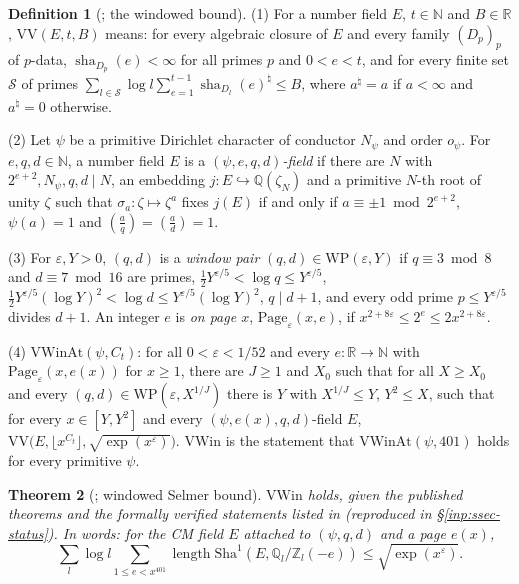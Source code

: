 \documentclass[10pt]{amsart}
\newtheorem{theorem}{Theorem}[section]
\theoremstyle{definition}
\newtheorem{definition}[theorem]{Definition}
\theoremstyle{remark}
\newcommand{\R}{\mathbb R}
\newcommand{\N}{\mathbb N}
\newcommand{\Z}{\mathbb Z}
\newcommand{\Q}{\mathbb Q}
\begin{document}
\begin{definition}[{\cite[Definition~\ref{A-i5:def-vwin}]{Annex}}; the windowed bound]\label{inp:def-vwin}
(1) For a number field $E$, $t\in\N$ and $B\in\R$, $\mathrm{VV}(E,t,B)$ means:
for every algebraic closure of $E$ and every family $(D_p)_p$ of $p$-data,
$\operatorname{sha}_{D_p}(e)<\infty$ for all primes $p$ and $0<e<t$, and for
every finite set $\mathcal S$ of primes
$\sum_{l\in\mathcal S}\log l\sum_{e=1}^{t-1}\operatorname{sha}_{D_l}(e)^\natural\le B$,
where $a^\natural=a$ if $a<\infty$ and $a^\natural=0$ otherwise.

(2) Let $\psi$ be a primitive Dirichlet character of conductor $N_\psi$ and
order $o_\psi$.  For $e,q,d\in\N$, a number field $E$ is a
\emph{$(\psi,e,q,d)$-field} if there are $N$ with $2^{e+2},N_\psi,q,d\mid N$,
an embedding $j\colon E\hookrightarrow\Q(\zeta_N)$ and a primitive $N$-th root
of unity $\zeta$ such that $\sigma_a\colon\zeta\mapsto\zeta^a$ fixes $j(E)$ if
and only if $a\equiv\pm1\bmod 2^{e+2}$, $\psi(a)=1$ and
$(\frac aq)=(\frac ad)=1$.

(3) For $\varepsilon,Y>0$, $(q,d)$ is a \emph{window pair}
$(q,d)\in\mathrm{WP}(\varepsilon,Y)$ if $q\equiv3\bmod8$ and $d\equiv7\bmod16$
are primes, $\tfrac12Y^{\varepsilon/5}<\log q\le Y^{\varepsilon/5}$,
$\tfrac12Y^{\varepsilon/5}(\log Y)^2<\log d\le Y^{\varepsilon/5}(\log Y)^2$,
$q\mid d+1$, and every odd prime $p\le Y^{\varepsilon/5}$ divides $d+1$.  An
integer $e$ is \emph{on page $x$}, $\mathrm{Page}_\varepsilon(x,e)$, if
$x^{2+8\varepsilon}\le2^e\le2x^{2+8\varepsilon}$.

(4) $\mathrm{VWinAt}(\psi,C_t)$: for all $0<\varepsilon<1/52$ and every
$e\colon\R\to\N$ with $\mathrm{Page}_\varepsilon(x,e(x))$ for $x\ge1$, there
are $J\ge1$ and $X_0$ such that for all $X\ge X_0$ and every
$(q,d)\in\mathrm{WP}(\varepsilon,X^{1/J})$ there is $Y$ with $X^{1/J}\le Y$,
$Y^2\le X$, such that for every $x\in[Y,Y^2]$ and every
$(\psi,e(x),q,d)$-field $E$,
$\mathrm{VV}\bigl(E,\lfloor x^{C_t}\rfloor,\sqrt{\exp(x^\varepsilon)}\bigr)$.
$\mathrm{VWin}$ is the statement that $\mathrm{VWinAt}(\psi,401)$ holds for every
primitive $\psi$.
\end{definition}

\begin{theorem}[{\cite[Theorem~\ref{A-i5:thm-vwin}]{Annex}}; windowed Selmer bound]\label{inp:thm-vwin}
$\mathrm{VWin}$ holds, given the published theorems and the formally
verified statements listed in
\cite[Theorem~\ref{A-i5:thm-vwin}]{Annex} \textup{(}reproduced in
\S\ref{inp:ssec-status}\textup{)}. In words: for the CM field $E$ attached to
$(\psi,q,d)$ and a page $e(x)$,
\[
 \sum_l\log l\sum_{1\le e<x^{401}}\operatorname{length}\mathrm{Sha}^1(E,\Q_l/\Z_l(-e))\le\sqrt{\exp(x^\varepsilon)} .
\]
\end{theorem}
\end{document}
